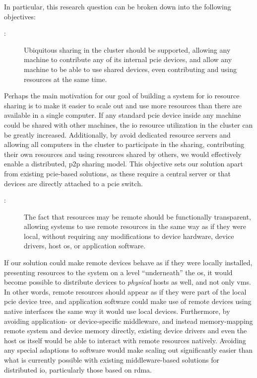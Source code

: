 In particular, this research question can be broken down into the following objectives:
%
\begin{description}
    \item[:] Ubiquitous sharing in the cluster should be supported, allowing any machine to contribute any of its internal \gls{pcie} devices, and allow any machine to be able to use shared devices, even contributing and using resources at the same time.
\end{description}
Perhaps the main motivation for our goal of building a system for \gls{io} resource sharing is to make it easier to scale out and use more resources than there are available in a single computer. 
If any standard \gls{pcie} device inside any machine could be shared with other machines, the \gls{io} resource utilization in the cluster can be greatly increased.
Additionally, by avoid dedicated resource servers and allowing all computers in the cluster to participate in the sharing, contributing their own resources and using resources shared by others, we would effectively enable a distributed, \gls{p2p} sharing model. This objective sets our solution apart from existing \gls{pcie}-based solutions, as these require a central server or that devices are directly attached to a \gls{pcie} switch.

\begin{description}
    \item[:] The fact that resources may be remote should be functionally transparent, allowing systems to use remote resources in the same way as if they were local, without requiring any modifications to device hardware, device drivers, host \gls{os}, or application software.
\end{description}
If our solution could make remote devices behave as if they were locally installed, presenting resources to the system on a level ``underneath'' the \gls{os}, it would become possible to distribute devices to \emph{physical} hosts as well, and not only \glspl{vm}. 
In other words, remote resources should appear as if they were part of the local \gls{pcie} device tree, and application software could make use of remote devices using native interfaces the same way it would use local devices.
%
Furthermore, by avoiding application- or device-specific middleware, and instead memory-mapping remote system and device memory directly, existing device drivers and even the host \gls{os} itself would be able to interact with remote resources natively.
Avoiding any special adaptions to software would make scaling out significantly easier than what is currently possible with existing middleware-based solutions for distributed \gls{io}, particularly those based on \gls{rdma}.

